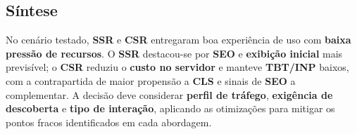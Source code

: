 \subsection{Síntese}
No cenário testado, \textbf{SSR} e \textbf{CSR} entregaram boa experiência de uso com \textbf{baixa pressão de recursos}. O \textbf{SSR} destacou-se por \textbf{SEO} e \textbf{exibição inicial} mais previsível; o \textbf{CSR} reduziu o \textbf{custo no servidor} e manteve \textbf{TBT/INP} baixos, com a contrapartida de maior propensão a \textbf{CLS} e sinais de \textbf{SEO} a complementar. A decisão deve considerar \textbf{perfil de tráfego}, \textbf{exigência de descoberta} e \textbf{tipo de interação}, aplicando as otimizações para mitigar os pontos fracos identificados em cada abordagem.

